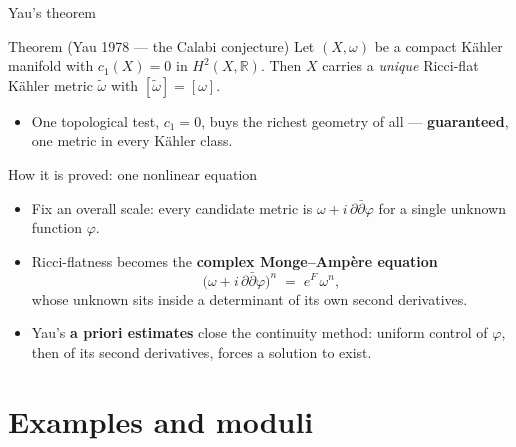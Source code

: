 \documentclass[aspectratio=169]{beamer}
\begin{document}
\begin{frame}{Yau's theorem}
  \begin{alertblock}{Theorem (Yau 1978 — the Calabi conjecture)}
    Let $(X,\omega)$ be a compact Kähler manifold with $c_1(X) = 0$ in
    $H^2(X,\mathbb{R})$. Then $X$ carries a \emph{unique} Ricci-flat
    Kähler metric $\tilde\omega$ with $[\tilde\omega] = [\omega]$.
  \end{alertblock}
  \vspace{0.4em}
  \vspace{0.2em}
  \begin{itemize}
    \item One topological test, $c_1 = 0$, buys the richest geometry of all —
          \textbf{guaranteed}, one metric in every Kähler class.
  \end{itemize}
\end{frame}

\begin{frame}{How it is proved: one nonlinear equation}
  \begin{itemize}
    \item Fix an overall scale: every candidate metric is
          $\omega + i\,\partial\bar\partial\varphi$ for a single unknown
          function $\varphi$.
    \item Ricci-flatness becomes the \textbf{complex Monge–Ampère equation}
          \[ \bigl(\omega + i\,\partial\bar\partial\varphi\bigr)^{n}
             \;=\; e^{F}\,\omega^{n}, \]
          whose unknown sits inside a determinant of its own second derivatives.
    \item Yau's \textbf{a priori estimates} close the continuity method:
          uniform control of $\varphi$, then of its second derivatives,
          forces a solution to exist.
  \end{itemize}
\end{frame}

\section{Examples and moduli}
\end{document}
